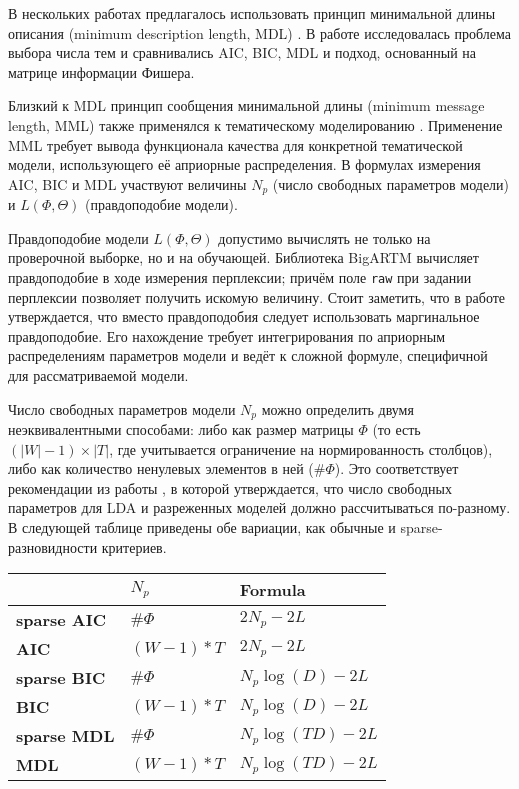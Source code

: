 В нескольких работах предлагалось  использовать принцип минимальной длины описания (minimum description length, MDL) \cite{image_segm,gerlach2018network}. В работе \cite{mml0} исследовалась проблема выбора числа тем и сравнивались AIC, BIC, MDL и подход, основанный на матрице информации Фишера.

Близкий к MDL принцип сообщения минимальной длины (minimum message length, MML) также применялся к тематическому моделированию \cite{mml1,mml2,mml3,mml4,mml5}.
Применение MML требует вывода функционала качества для конкретной тематической модели, использующего её априорные распределения. В формулах измерения AIC, BIC и MDL участвуют величины $N_p$ (число свободных параметров модели) и $L(\Phi,\Theta)$ (правдоподобие модели).

Правдоподобие модели $L(\Phi,\Theta)$ допустимо вычислять не только на проверочной выборке, но и на обучающей. Библиотека BigARTM вычисляет правдоподобие в ходе измерения перплексии; причём поле \texttt{raw} при задании перплексии позволяет получить искомую величину. Стоит заметить, что в работе \cite{gerlach2018network} утверждается, что вместо правдоподобия следует использовать маргинальное правдоподобие. Его нахождение требует интегрирования по априорным распределениям параметров модели и ведёт к сложной формуле, специфичной для рассматриваемой модели.

Число свободных параметров модели $N_p$ можно определить двумя неэквивалентными способами: либо как размер матрицы $\Phi$ (то есть $(|W|-1) \times |T|$, где учитывается ограничение на нормированность столбцов), либо как количество ненулевых элементов в ней ($\#\Phi$). Это соответствует рекомендации из работы \cite{than2012fully}, в которой утверждается, что число свободных параметров для LDA и разреженных моделей должно рассчитываться по-разному. В следующей таблице приведены обе вариации, как обычные и sparse-разновидности критериев.

\begin{table}[ht]
    \centering
    \begin{tabular}{lll}
    \toprule
               & $N_p$       & Formula                                             \\
    \midrule
    \textbf{sparse AIC} & $\#\Phi$       & $2 N_p - 2 L$                \\
    \textbf{AIC}        & $(W - 1) * T$  & $2 N_p - 2 L$                \\
    \textbf{sparse BIC} & $\#\Phi$       & $N_p \log(D) - 2 L$          \\
    \textbf{BIC}        & $(W - 1) * T$  & $N_p \log(D) - 2 L$          \\
    \textbf{sparse MDL} & $\#\Phi$       & $N_p \log(TD) - 2 L$         \\
    \textbf{MDL}        & $(W - 1) * T$  & $N_p \log(TD) - 2 L$\\
    \bottomrule
    \end{tabular}
\end{table}

